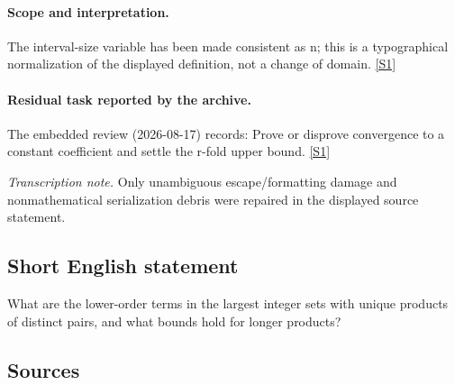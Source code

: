 \documentclass[11pt,a4paper]{article}
\newcommand{\sref}[2]{\hyperlink{source:#1:#2}{[S#2]}}
\begin{document}
\paragraph{Scope and interpretation.}

The interval-size variable has been made consistent as n; this is a typographical normalization of the displayed definition, not a change of domain. \sref{statement}{1}

\paragraph{Residual task reported by the archive.}

The embedded review (2026-08-17) records: Prove or disprove convergence to a constant coefficient and settle the r-fold upper bound. \sref{statement}{1}

{\small\emph{Transcription note.} Only unambiguous escape/formatting damage and nonmathematical serialization debris were repaired in the displayed source statement.}

\subsection{Short English statement}

What are the lower-order terms in the largest integer sets with unique products of distinct pairs, and what bounds hold for longer products?

\subsection{Sources}
\end{document}
